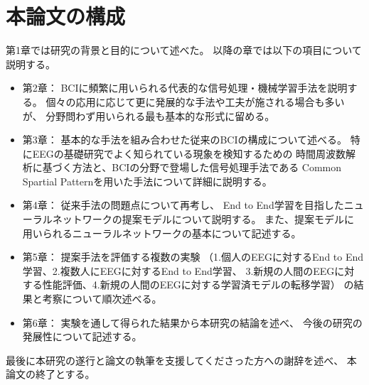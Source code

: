 \section{本論文の構成}
第1章では研究の背景と目的について述べた。
以降の章では以下の項目について説明する。
\begin{itemize}
    \item 第2章：
    BCIに頻繁に用いられる代表的な信号処理・機械学習手法を説明する。
    個々の応用に応じて更に発展的な手法や工夫が施される場合も多いが、
    分野問わず用いられる最も基本的な形式に留める。
    \item 第3章：
    基本的な手法を組み合わせた従来のBCIの構成について述べる。
    特にEEGの基礎研究でよく知られている現象を検知するための
    時間周波数解析に基づく方法と、BCIの分野で登場した信号処理手法である
    Common Spartial Patternを用いた手法について詳細に説明する。
    \item 第4章：
    従来手法の問題点について再考し、
    End to End学習を目指したニューラルネットワークの提案モデルについて説明する。
    また、提案モデルに用いられるニューラルネットワークの基本について記述する。
    \item 第5章：
    提案手法を評価する複数の実験
    （1.個人のEEGに対するEnd to End学習、2.複数人にEEGに対するEnd to End学習、
    3.新規の人間のEEGに対する性能評価、4.新規の人間のEEGに対する学習済モデルの転移学習）
    の結果と考察について順次述べる。
    \item 第6章：
    実験を通して得られた結果から本研究の結論を述べ、
    今後の研究の発展性について記述する。
\end{itemize}
最後に本研究の遂行と論文の執筆を支援してくださった方への謝辞を述べ、
本論文の終了とする。